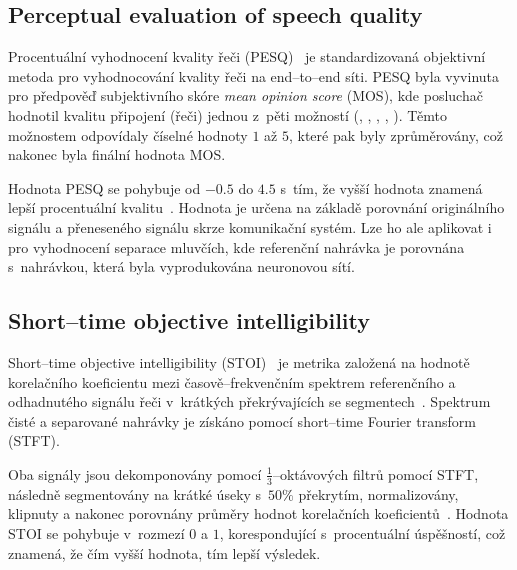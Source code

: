 

\subsection{Perceptual evaluation of speech quality}
Procentuální vyhodnocení kvality řeči (PESQ)~\cite{pesq-itut} je standardizovaná objektivní metoda pro vyhodnocování kvality řeči na end--to--end síti. PESQ byla vyvinuta pro předpověď subjektivního skóre \textit{mean opinion score} (MOS), kde posluchač hodnotil kvalitu připojení (řeči) jednou z~pěti možností (, , , , ). Těmto možnostem odpovídaly číselné hodnoty $1$ až $5$, které pak byly zprůměrovány, což nakonec byla finální hodnota MOS.

Hodnota PESQ se pohybuje od $-0.5$ do $4.5$ s~tím, že vyšší hodnota znamená lepší procentuální kvalitu~\cite{sdr-pesq-optimization}. Hodnota je určena na základě porovnání originálního signálu a přeneseného signálu skrze komunikační systém. Lze ho ale aplikovat i pro vyhodnocení separace mluvčích, kde referenční nahrávka je porovnána s~nahrávkou, která byla vyprodukována neuronovou sítí.





\subsection{Short--time objective intelligibility}
Short--time objective intelligibility (STOI)~\cite{taal-stoi} je metrika založená na hodnotě korelačního koeficientu mezi časově--frekvenčním spektrem referenčního a odhadnutého signálu řeči v~krátkých překrývajících se segmentech~\cite{5713237}. Spektrum čisté a separované nahrávky je získáno pomocí short--time Fourier transform (STFT).

Oba signály jsou dekomponovány pomocí $\frac{1}{3}$--oktávových filtrů pomocí STFT, následně segmentovány na krátké úseky s~$50\%$ překrytím, normalizovány, klipnuty a nakonec porovnány průměry hodnot korelačních koeficientů~\cite{taal-stoi}. Hodnota STOI se pohybuje v~rozmezí $0$ a $1$, korespondující s~procentuální úspěšností, což znamená, že čím vyšší hodnota, tím lepší výsledek.

